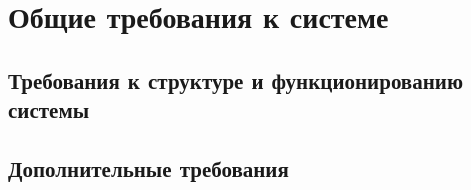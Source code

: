 \section{Общие требования к системе}


\subsection{Требования к структуре и функционированию системы}


\subsection{Дополнительные требования}
